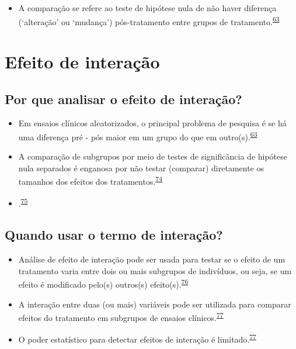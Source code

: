 \documentclass[
]{book}
\providecommand{\tightlist}{%
  \setlength{\itemsep}{0pt}\setlength{\parskip}{0pt}}
\begin{document}
\begin{itemize}
\tightlist
\item
  A comparação se refere ao teste de hipótese nula de não haver diferença (`alteração' ou `mudança') pós-tratamento entre grupos de tratamento.\textsuperscript{\protect\hyperlink{ref-bland2011}{63}}
\end{itemize}

\hypertarget{interacao}{%
\section{Efeito de interação}\label{interacao}}

\hypertarget{por-que-analisar-o-efeito-de-interauxe7uxe3o}{%
\subsection{Por que analisar o efeito de interação?}\label{por-que-analisar-o-efeito-de-interauxe7uxe3o}}

\begin{itemize}
\item
  Em ensaios clínicos aleatorizados, o principal problema de pesquisa é se há uma diferença pré - pós maior em um grupo do que em outro(s).\textsuperscript{\protect\hyperlink{ref-bland2011}{63}}
\item
  A comparação de subgrupos por meio de testes de significância de hipótese nula separados é enganosa por não testar (comparar) diretamente os tamanhos dos efeitos dos tratamentos.\textsuperscript{\protect\hyperlink{ref-Matthews1996}{74}}
\item
  .\textsuperscript{\protect\hyperlink{ref-Bours2023}{75}}
\end{itemize}

\hypertarget{quando-usar-o-termo-de-interauxe7uxe3o}{%
\subsection{Quando usar o termo de interação?}\label{quando-usar-o-termo-de-interauxe7uxe3o}}

\begin{itemize}
\item
  Análise de efeito de interação pode ser usada para testar se o efeito de um tratamento varia entre dois ou mais subgrupos de indivíduos, ou seja, se um efeito é modificado pelo(s) outros(s) efeito(s).\textsuperscript{\protect\hyperlink{ref-Altman1996}{76}}
\item
  A interação entre duas (ou mais) variáveis pode ser utilizada para comparar efeitos do tratamento em subgrupos de ensaios clínicos.\textsuperscript{\protect\hyperlink{ref-Altman2003}{77}}
\item
  O poder estatístico para detectar efeitos de interação é limitado.\textsuperscript{\protect\hyperlink{ref-Altman2003}{77}}
\end{itemize}
\end{document}
